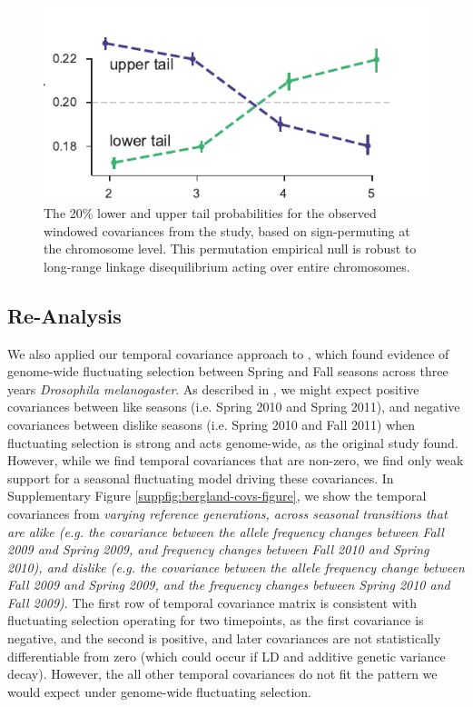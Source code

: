 \documentclass[11pt]{article}
\newcommand{\vb}[1]{{\it \color{blue} #1}}
\begin{document}
\begin{figure}[!ht]
  \centering

  \includegraphics[]{figures/barghi-tailprobs-seqid-20.pdf}

  \caption{The 20\% lower and upper tail probabilities for the observed
  windowed covariances from the \textcite{Barghi2019-qy} study, based on
  sign-permuting at the chromosome level. This permutation empirical null
  is robust to long-range linkage disequilibrium acting over entire chromosomes.}
  
  \label{suppfig:barghi-tailprobs-seqid}
\end{figure}

\subsection{\textcite{Bergland2014-ij} Re-Analysis}


We also applied our temporal covariance approach to \textcite{Bergland2014-ij},
which found evidence of genome-wide fluctuating selection between Spring and
Fall seasons across three years \emph{Drosophila melanogaster}. As described in
\textcite{Buffalo2019-io}, we might expect positive covariances between like
seasons (i.e. Spring 2010 and Spring 2011), and negative covariances between
dislike seasons (i.e. Spring 2010 and Fall 2011) when fluctuating selection is
strong and acts genome-wide, as the original study found. However, while we
find temporal covariances that are non-zero, we find only weak support for a
seasonal fluctuating model driving these covariances. In Supplementary Figure
\ref{suppfig:bergland-covs-figure}, we show the temporal covariances from
\vb{varying reference generations, across seasonal transitions that are alike (e.g.
the covariance between the allele frequency changes between Fall 2009 and
Spring 2009, and frequency changes between Fall 2010 and Spring 2010), and
dislike (e.g. the covariance between the allele frequency change between Fall
2009 and Spring 2009, and the frequency changes between Spring 2010 and Fall
2009)}. The first row of temporal covariance matrix is consistent with
fluctuating selection operating for two timepoints, as the first covariance is
negative, and the second is positive, and later covariances are not
statistically differentiable from zero (which could occur if LD and additive
genetic variance decay). However, the all other temporal covariances do not fit
the pattern we would expect under genome-wide fluctuating selection.
\end{document}
